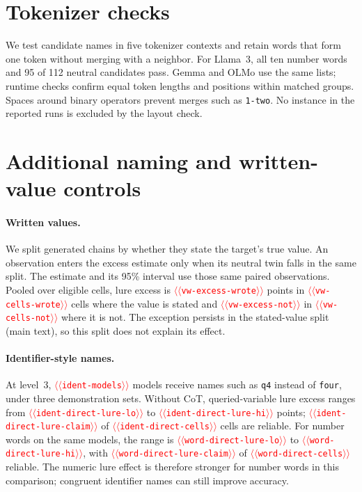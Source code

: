 \documentclass[11pt]{article}
\providecommand{\NUM}[1]{\textcolor{red}{$\langle\langle$\texttt{#1}$\rangle\rangle$}}
\begin{document}
\section{Tokenizer checks}
\label{app:tok}
We test candidate names in five tokenizer contexts and retain words that form one token
without merging with a neighbor. For Llama~3, all ten number words and 95 of 112 neutral
candidates pass. Gemma and OLMo use the same lists; runtime checks confirm equal token lengths
and positions within matched groups. Spaces around binary operators prevent merges such as
\texttt{1-two}. No instance in the reported runs is excluded by the layout check.

\section{Additional naming and written-value controls}
\label{app:controls}

\paragraph{Written values.} We split generated chains by whether they state the target's true
value. An observation enters the excess estimate only when its neutral twin falls in the same
split. The estimate and its 95\% interval use those same paired observations. Pooled over
eligible cells, lure excess is \NUM{vw-excess-wrote} points in \NUM{vw-cells-wrote} cells where
the value is stated and \NUM{vw-excess-not} in \NUM{vw-cells-not} where it is not. The exception
persists in the stated-value split (main text), so this split does not explain its effect.

\paragraph{Identifier-style names.} At level~3, \NUM{ident-models} models receive names such as
\texttt{q4} instead of \texttt{four}, under three demonstration sets. Without CoT, queried-variable
lure excess ranges from \NUM{ident-direct-lure-lo} to \NUM{ident-direct-lure-hi} points;
\NUM{ident-direct-lure-claim} of \NUM{ident-direct-cells} cells are reliable. For number words
on the same models, the range is \NUM{word-direct-lure-lo} to \NUM{word-direct-lure-hi}, with
\NUM{word-direct-lure-claim} of \NUM{word-direct-cells} reliable. The numeric lure effect is
therefore stronger for number words in this comparison; congruent identifier names can still
improve accuracy.
\end{document}
